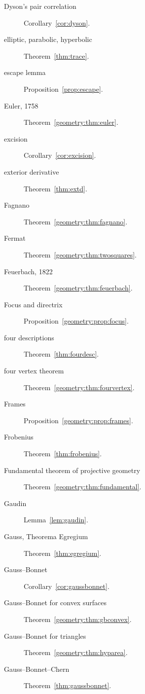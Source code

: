 \begin{description}
\item[Dyson's pair correlation] Corollary~\ref{cor:dyson}.
\item[elliptic, parabolic, hyperbolic] Theorem~\ref{thm:trace}.
\item[escape lemma] Proposition~\ref{prop:escape}.
\item[Euler, 1758] Theorem~\ref{geometry:thm:euler}.
\item[excision] Corollary~\ref{cor:excision}.
\item[exterior derivative] Theorem~\ref{thm:extd}.
\item[Fagnano] Theorem~\ref{geometry:thm:fagnano}.
\item[Fermat] Theorem~\ref{geometry:thm:twosquares}.
\item[Feuerbach, 1822] Theorem~\ref{geometry:thm:feuerbach}.
\item[Focus and directrix] Proposition~\ref{geometry:prop:focus}.
\item[four descriptions] Theorem~\ref{thm:fourdesc}.
\item[four vertex theorem] Theorem~\ref{geometry:thm:fourvertex}.
\item[Frames] Proposition~\ref{geometry:prop:frames}.
\item[Frobenius] Theorem~\ref{thm:frobenius}.
\item[Fundamental theorem of projective geometry] Theorem~\ref{geometry:thm:fundamental}.
\item[Gaudin] Lemma~\ref{lem:gaudin}.
\item[Gauss, Theorema Egregium] Theorem~\ref{thm:egregium}.
\item[Gauss--Bonnet] Corollary~\ref{cor:gaussbonnet}.
\item[Gauss--Bonnet for convex surfaces] Theorem~\ref{geometry:thm:gbconvex}.
\item[Gauss--Bonnet for triangles] Theorem~\ref{geometry:thm:hyparea}.
\item[Gauss--Bonnet--Chern] Theorem~\ref{thm:gaussbonnet}.

\end{description}

